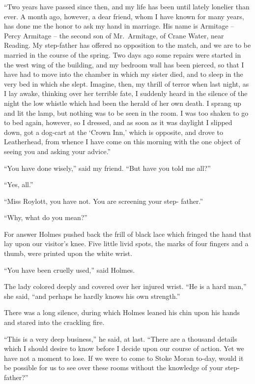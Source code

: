 “Two years have passed since then, and my life has been
until lately lonelier than ever. A month ago, however, a dear
friend, whom I have known for many years, has done me the
honor to ask my hand in marriage. His name is Armitage -- Percy
Armitage -- the second son of Mr.~Armitage, of Crane
Water, near Reading. My step-father has offered no opposition
to the match, and we are to be married in the course of
the spring. Two days ago some repairs were started in the
west wing of the building, and my bedroom wall has been
pierced, so that I have had to move into the chamber in which
my sister died, and to sleep in the very bed in which she
slept. Imagine, then, my thrill of terror when last night, as I
lay awake, thinking over her terrible fate, I suddenly heard in
the silence of the night the low whistle which had been the
herald of her own death. I sprang up and lit the lamp, but
nothing was to be seen in the room. I was too shaken to go
to bed again, however, so I dressed, and as soon as it was
daylight I slipped down, got a dog-cart at the ‘Crown Inn,’
which is opposite, and drove to Leatherhead, from whence
I have come on this morning with the one object of seeing
you and asking your advice.”

“You have done wisely,” said my friend. “But have you
told me all?”

“Yes, all.”

“Miss Roylott, you have not. You are screening your step-%
father.”

“Why, what do you mean?”

For answer Holmes pushed back the frill of black lace
which fringed the hand that lay upon our visitor’s knee. Five
little livid spots, the marks of four fingers and a thumb, were
printed upon the white wrist.

“You have been cruelly used,” said Holmes.

The lady colored deeply and covered over her injured
wrist. “He is a hard man,” she said, “and perhaps he hardly
knows his own strength.”

There was a long silence, during which Holmes leaned
his chin upon his hands and stared into the crackling
fire.

“This is a very deep business,” he said, at last. “There
are a thousand details which I should desire to know before I
decide upon our course of action. Yet we have not a moment
to lose. If we were to come to Stoke Moran to-day,
would it be possible for us to see over these rooms without
the knowledge of your step-father?”

